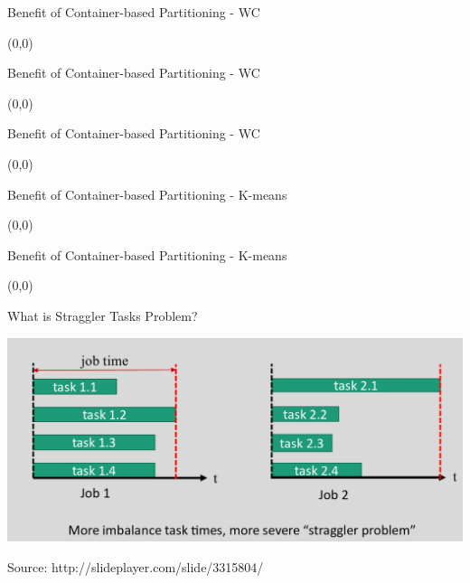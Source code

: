 \documentclass[english]{beamer} %
\begin{document}
\begin{frame}{Benefit of Container-based Partitioning - WC}
\begin{textblock}{1}(0,0)
\end{textblock} 
\end{frame}

\begin{frame}{Benefit of Container-based Partitioning - WC}
\begin{textblock}{1}(0,0)
\end{textblock} 
\end{frame}

\begin{frame}{Benefit of Container-based Partitioning - WC}
\begin{textblock}{1}(0,0)
\end{textblock} 
\end{frame}

\begin{frame}{Benefit of Container-based Partitioning - K-means}
\begin{textblock}{1}(0,0)
\end{textblock} 
\end{frame}

\begin{frame}{Benefit of Container-based Partitioning - K-means}
\begin{textblock}{1}(0,0)
\end{textblock} 
\end{frame}

\begin{frame}{What is Straggler Tasks Problem?}
\begin{center}
\includegraphics[scale=0.3]{fig/straggler}
\end{center}
Source: http://slideplayer.com/slide/3315804/
\end{frame}
\end{document}
